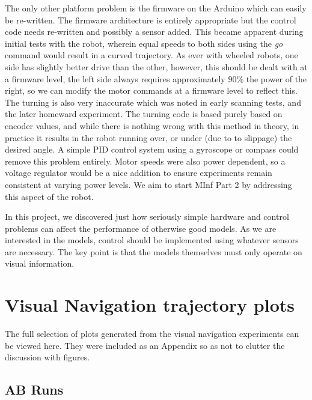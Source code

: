 \documentclass[a4paper,11pt,twoside,openright]{article}
\let\oldsection\section
\def\section{\cleardoublepage\oldsection}
\begin{document}
The only other platform problem is the firmware on the Arduino
which can easily be re-written. The firmware architecture is entirely appropriate but the control code
needs re-written and possibly a sensor added. This became apparent during initial tests with the robot, wherein
equal speeds to both sides using the \textit{go} command would result in a curved trajectory. As ever with
wheeled robots, one side has slightly better drive than the other, however, this should be dealt with at a
firmware level, the left side always requires approximately $90\%$ the power of the right, so we can
modify the motor commands at a firmware level to reflect this. The turning is also very inaccurate which
was noted in early scanning tests, and the later homeward experiment. The turning code is based purely based on
encoder values, and while there is nothing wrong with this method in theory, in practice it results in the robot
running over, or under (due to to slippage) the desired angle. A simple PID control system using a gyroscope
or compass could remove this problem entirely. Motor speeds were also power dependent, so a voltage regulator
would be a nice addition to ensure experiments remain consistent at varying power levels. We aim to start
MInf Part 2 by addressing this aspect of the robot.
\newline

In this project, we discovered just how seriously simple hardware and 
control problems can affect the performance of otherwise good models. As we are interested in the models,
control should be implemented using whatever sensors are necessary. The key point is that the models themselves
must only operate on visual information. 
\newpage



\newpage

\appendix
\section{Visual Navigation trajectory plots} \label{app:plots}

The full selection of plots generated from the visual navigation experiments can be viewed here. They were included
as an Appendix so as not to clutter the discussion with figures.

\subsection{AB Runs}
\end{document}
